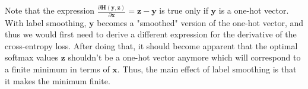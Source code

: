 \documentclass{./../../tex_import/ETHuebung_english}
\begin{document}
Note that the expression $\frac{\partial \mathbf H(\mathbf y, \mathbf z)}{\partial \mathbf x} = \mathbf z - \mathbf y$ is true only if $\mathbf y$ is a one-hot vector. With label smoothing, $\mathbf y$ becomes a "smoothed" version of the one-hot vector, and thus we would first need to derive a different expression for the derivative of the cross-entropy loss. After doing that, it should become apparent that the optimal softmax values $\mathbf z$ shouldn't be a one-hot vector anymore which will correspond to a finite minimum in terms of $\mathbf x$. 
Thus, the main effect of label smoothing is that it makes the minimum finite. 
\end{document}
